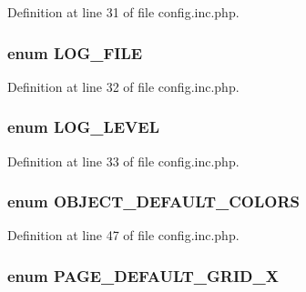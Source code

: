 Definition at line 31 of file config.inc.php.

\hypertarget{config_8inc_8php_a6de83433b64b24349644a4c2d839dcb7}{
\subsubsection[{LOG\_\-FILE}]{\setlength{\rightskip}{0pt plus 5cm}enum {\bf LOG\_\-FILE}}}
\label{config_8inc_8php_a6de83433b64b24349644a4c2d839dcb7}


Definition at line 32 of file config.inc.php.

\hypertarget{config_8inc_8php_aa5a9053636a30269210c54e734e0d583}{
\subsubsection[{LOG\_\-LEVEL}]{\setlength{\rightskip}{0pt plus 5cm}enum {\bf LOG\_\-LEVEL}}}
\label{config_8inc_8php_aa5a9053636a30269210c54e734e0d583}


Definition at line 33 of file config.inc.php.

\hypertarget{config_8inc_8php_a3e205a45d91d7ef191e53487b6b48b3b}{
\subsubsection[{OBJECT\_\-DEFAULT\_\-COLORS}]{\setlength{\rightskip}{0pt plus 5cm}enum {\bf OBJECT\_\-DEFAULT\_\-COLORS}}}
\label{config_8inc_8php_a3e205a45d91d7ef191e53487b6b48b3b}


Definition at line 47 of file config.inc.php.

\hypertarget{config_8inc_8php_abc1c54acdbce897c718854b663517cf9}{
\subsubsection[{PAGE\_\-DEFAULT\_\-GRID\_\-X}]{\setlength{\rightskip}{0pt plus 5cm}enum {\bf PAGE\_\-DEFAULT\_\-GRID\_\-X}}}
\label{config_8inc_8php_abc1c54acdbce897c718854b663517cf9}


